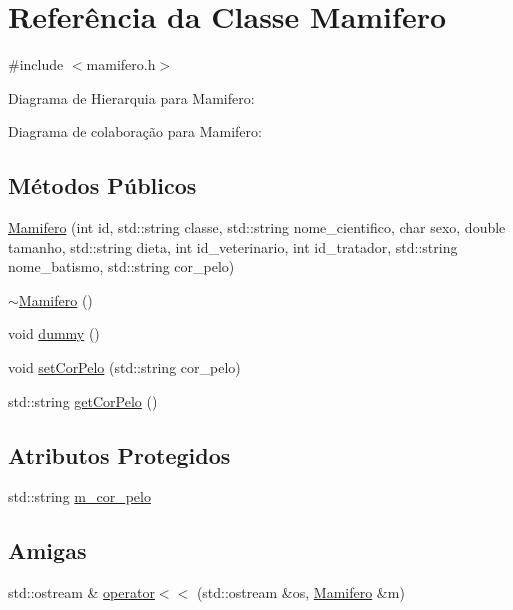 \hypertarget{classMamifero}{}\section{Referência da Classe Mamifero}
\label{classMamifero}


{\ttfamily \#include $<$mamifero.\+h$>$}



Diagrama de Hierarquia para Mamifero\+:


Diagrama de colaboração para Mamifero\+:
\subsection*{Métodos Públicos}
\begin{DoxyCompactItemize}
\item 
\hyperlink{classMamifero_aa27e289fb8db4ba86fa4a5e03a0c7601}{Mamifero} (int id, std\+::string classe, std\+::string nome\+\_\+cientifico, char sexo, double tamanho, std\+::string dieta, int id\+\_\+veterinario, int id\+\_\+tratador, std\+::string nome\+\_\+batismo, std\+::string cor\+\_\+pelo)
\item 
\hyperlink{classMamifero_a56eb196d45222e754eb6f19000667d5d}{$\sim$\+Mamifero} ()
\item 
void \hyperlink{classMamifero_a8f2a488b1796d3ccf0ff9e1c5a82af05}{dummy} ()
\item 
void \hyperlink{classMamifero_aae48d8a2c42c954cabebaeeb47a65b77}{set\+Cor\+Pelo} (std\+::string cor\+\_\+pelo)
\item 
std\+::string \hyperlink{classMamifero_ab164b4053fcb1912af011c1204b19fc1}{get\+Cor\+Pelo} ()
\end{DoxyCompactItemize}
\subsection*{Atributos Protegidos}
\begin{DoxyCompactItemize}
\item 
std\+::string \hyperlink{classMamifero_a5a7737addd9b2a5736c2fe8edaba1220}{m\+\_\+cor\+\_\+pelo}
\end{DoxyCompactItemize}
\subsection*{Amigas}
\begin{DoxyCompactItemize}
\item 
std\+::ostream \& \hyperlink{classMamifero_a0640dfc54a3f3ac27ceacc52a23739e3}{operator$<$$<$} (std\+::ostream \&os, \hyperlink{classMamifero}{Mamifero} \&m)
\end{DoxyCompactItemize}


